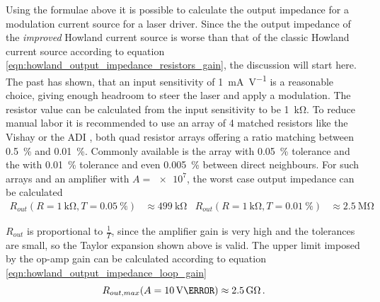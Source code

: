 Using the formulae above it is possible to calculate the output impedance for a modulation current source for a laser driver. Since the the output impedance of the \textit{improved} Howland current source is worse than that of the classic Howland current source according to equation \ref{eqn:howland_output_impedance_resistors_gain}, the discussion will start here. The past has shown, that an input sensitivity of \qty{1}{\mA \per \V} is a reasonable choice, giving enough headroom to steer the laser and apply a modulation. The resistor value can be calculated from the input sensitivity to be \qty{1}{\kilo\ohm}. To reduce manual labor it is recommended to use an array of \num{4} matched resistors like the Vishay  \cite{datasheet_MORN} or the ADI  \cite{datasheet_LT5400}, both quad resistor arrays offering a ratio matching between \qty{0.5}{\percent} and \qty{0.01}{\percent}. Commonly available is the  array with \qty{0.05}{\percent} tolerance and the  with \qty{0.01}{\percent} tolerance and even \qty{0.005}{\percent} between direct neighbours. For such arrays and an amplifier with $A=\num{e7}$, the worst case output impedance can be calculated
\begin{align*}
    R_{out}(R=\qty{1}{\kilo\ohm}, T=\qty{0.05}{\percent}) &\approx \qty{499}{\kilo\ohm} & R_{out}(R=\qty{1}{\kilo\ohm}, T=\qty{0.01}{\percent}) &\approx \qty{2.5}{\mega\ohm}
\end{align*}

$R_{out}$ is proportional to $\frac{1}{T}$, since the amplifier gain is very high and the tolerances are small, so the Taylor expansion shown above is valid. The upper limit imposed by the op-amp gain can be calculated according to equation \ref{eqn:howland_output_impedance_loop_gain}
\begin{equation*}
    R_{out, max} (A=\qty{10}{\V}{\uV}) \approx \qty{2.5}{\giga\ohm}\,.
\end{equation*}

